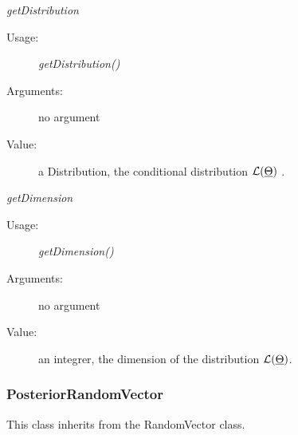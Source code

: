 \begin{description}
\begin{description}
\item \textit{getDistribution}
\begin{description}
\item[Usage:] \textit{getDistribution()}
\item[Arguments:] no argument
\item[Value:] a Distribution, the conditional distribution ${\mathcal L}({\underline{\Theta}})$ .
\end{description}
\bigskip

\item \textit{getDimension}
\begin{description}
\item[Usage:] \textit{getDimension()}
\item[Arguments:] no argument
\item[Value:] an integrer, the dimension of the distribution ${\mathcal L}({\underline{\Theta}})$.
\end{description}


\end{description}

\end{description}


\newpage
{}
\subsubsection{PosteriorRandomVector}

This class inherits from the RandomVector class.

